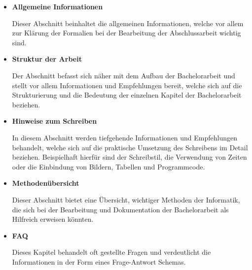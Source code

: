 \documentclass{scrreprt}
\begin{document}
\begin{itemize}
\item \textbf{Allgemeine Informationen}
\par Dieser Abschnitt beinhaltet die allgemeinen Informationen, welche vor allem zur Klärung der Formalien bei der Bearbeitung der Abschlussarbeit wichtig sind.

\item \textbf{Struktur der Arbeit}
\par Der Abschnitt befasst sich näher mit dem Aufbau der Bachelorarbeit und stellt vor allem Informationen und Empfehlungen bereit, welche sich auf die Strukturierung und die Bedeutung der einzelnen Kapitel der Bachelorarbeit beziehen. 

\item \textbf{Hinweise zum Schreiben}
\par In diesem Abschnitt werden tiefgehende Informationen und Empfehlungen behandelt, welche sich auf die praktische Umsetzung des Schreibens im Detail beziehen. Beispielhaft hierfür sind der Schreibstil, die Verwendung von Zeiten oder die Einbindung von Bildern, Tabellen und Programmcode.

\item \textbf{Methodenübersicht}
\par Dieser Abschnitt bietet eine Übersicht, wichtiger Methoden der Informatik, die sich bei der Bearbeitung und Dokumentation der Bachelorarbeit als Hilfreich erweisen könnten.

\item \textbf{FAQ}
\par Dieses Kapitel behandelt oft gestellte Fragen und verdeutlicht die Informationen in der Form eines Frage-Antwort Schemas.
\end{itemize}
\end{document}
